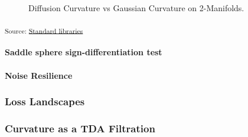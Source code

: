 \documentclass[
]{agujournal2019}
\let\oldparagraph\paragraph
\renewcommand{\paragraph}[1]{\oldparagraph{#1}\mbox{}}
\begin{document}
\begin{figure}[H]


\caption{\label{fig-2-manifolds}Diffusion Curvature vs Gaussian
Curvature on 2-Manifolds.}

\end{figure}%

\textsubscript{Source:
\href{https://professorwug.github.io/diffusion-curvature//home/piriac/Pumberton/Workshop/21-SUMRY-Curvature/diffusion-curvature/nbs/experiments/2a-Toy-Manifolds.ipynb.html\#cell-fig-2-manifolds}{Standard
libraries}}

\paragraph{Saddle sphere sign-differentiation
test}\label{saddle-sphere-sign-differentiation-test}

\paragraph{Noise Resilience}\label{noise-resilience}

\subsubsection{Loss Landscapes}\label{loss-landscapes}

\subsubsection{Curvature as a TDA
Filtration}\label{curvature-as-a-tda-filtration}
\end{document}
